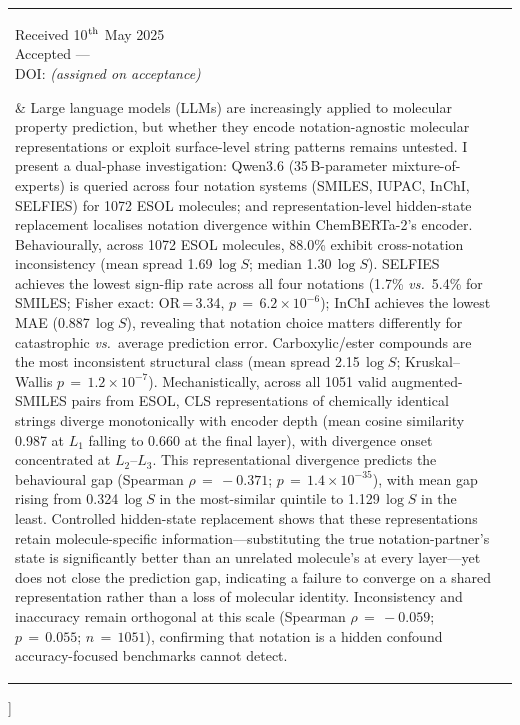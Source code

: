 \documentclass[twoside,twocolumn,9pt]{article}
\newcommand{\logS}{\ensuremath{\log S}}
\providecommand{\DIFaddend}{} %
\DeclareRobustCommand{\DIFaddend}{\DIFOaddend \let\includegraphics\DIFOincludegraphics} %
\begin{document}
\begin{@twocolumnfalse}
\begin{tabular}{m{4.5cm} p{13.5cm} }
\parbox{4.2cm}{\sffamily\scriptsize
  Received 10$^{\rm th}$ May 2025\\
  Accepted \phantom{10}---\phantom{May 2025}\\[3pt]
  DOI: \textit{(assigned on acceptance)}} &
\noindent\normalsize{%
Large language models (LLMs) are increasingly applied to molecular property prediction, but whether they encode notation-agnostic molecular representations or exploit surface-level string patterns remains untested. I present a dual-phase investigation: Qwen3.6 (35\,B-parameter mixture-of-experts) is queried across four notation systems (SMILES, IUPAC, InChI, SELFIES) for 1072 ESOL molecules; and representation-level hidden-state replacement localises notation divergence within ChemBERTa-2's encoder. Behaviourally, across 1072 ESOL molecules, 88.0\% exhibit cross-notation inconsistency (mean spread 1.69\,$\logS$; median 1.30\,$\logS$). SELFIES achieves the lowest sign-flip rate across all four notations (1.7\% \textit{vs.}\ 5.4\% for SMILES; Fisher exact: OR\,=\,3.34, $p\,=\,6.2\!\times\!10^{-6}$); InChI achieves the lowest MAE (0.887\,$\logS$), revealing that notation choice matters differently for catastrophic \textit{vs.}\ average prediction error. Carboxylic/ester compounds are the most inconsistent structural class (mean spread 2.15\,$\logS$; Kruskal--Wallis $p\,=\,1.2\!\times\!10^{-7}$). Mechanistically, across all 1051 valid augmented-SMILES pairs from ESOL, CLS representations of chemically identical strings diverge monotonically with encoder depth (mean cosine similarity 0.987 at $L_1$ falling to 0.660 at the final layer), with divergence onset concentrated at $L_2$--$L_3$. This representational divergence predicts the behavioural gap (Spearman $\rho\,=\,-0.371$; $p\,=\,1.4\!\times\!10^{-35}$), with mean gap rising from 0.324\,$\logS$ in the most-similar quintile to 1.129\,$\logS$ in the least. Controlled hidden-state replacement shows that these representations retain molecule-specific information---substituting the true notation-partner's state is significantly better than an unrelated molecule's at every layer---yet does not close the prediction gap, indicating a failure to converge on a shared representation rather than a loss of molecular identity. Inconsistency and inaccuracy remain orthogonal at this scale (Spearman $\rho\,=\,-0.059$; $p\,=\,0.055$; $n\,=\,1051$), confirming that notation is a hidden confound accuracy-focused benchmarks cannot detect.%
} \\

\end{tabular}

 \end{@twocolumnfalse} \vspace{0.6cm}
]
\DIFaddend %
\end{document}
